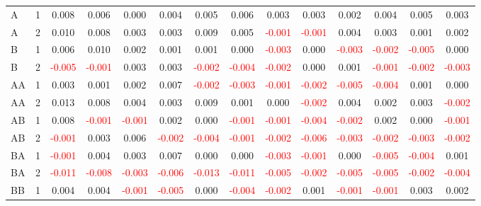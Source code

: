 \begin{table}[H]
{\begin{tabular}{llcccccccccccc}
A & 1 & 0.008 & 0.006 & 0.000 & 0.004 & 0.005 & 0.006 & 0.003 & 0.003 & 0.002 & 0.004 & 0.005 & 0.003\\
A & 2 & 0.010 & 0.008 & 0.003 & 0.003 & 0.009 & 0.005 & \textcolor{red}{-0.001} & \textcolor{red}{-0.001} & 0.004 & 0.003 & 0.001 & 0.002\\
B & 1 & 0.006 & 0.010 & 0.002 & 0.001 & 0.001 & 0.000 & \textcolor{red}{-0.003} & 0.000 & \textcolor{red}{-0.003} & \textcolor{red}{-0.002} & \textcolor{red}{-0.005} & 0.000\\
B & 2 & \textcolor{red}{-0.005} & \textcolor{red}{-0.001} & 0.003 & 0.003 & \textcolor{red}{-0.002} & \textcolor{red}{-0.004} & \textcolor{red}{-0.002} & 0.000 & 0.001 & \textcolor{red}{-0.001} & \textcolor{red}{-0.002} & \textcolor{red}{-0.003}\\
AA & 1 & 0.003 & 0.001 & 0.002 & 0.007 & \textcolor{red}{-0.002} & \textcolor{red}{-0.003} & \textcolor{red}{-0.001} & \textcolor{red}{-0.002} & \textcolor{red}{-0.005} & \textcolor{red}{-0.004} & 0.001 & 0.000\\
AA & 2 & 0.013 & 0.008 & 0.004 & 0.003 & 0.009 & 0.001 & 0.000 & \textcolor{red}{-0.002} & 0.004 & 0.002 & 0.003 & \textcolor{red}{-0.002}\\
AB & 1 & 0.008 & \textcolor{red}{-0.001} & \textcolor{red}{-0.001} & 0.002 & 0.000 & \textcolor{red}{-0.001} & \textcolor{red}{-0.001} & \textcolor{red}{-0.004} & \textcolor{red}{-0.002} & 0.002 & 0.000 & \textcolor{red}{-0.001}\\
AB & 2 & \textcolor{red}{-0.001} & 0.003 & 0.006 & \textcolor{red}{-0.002} & \textcolor{red}{-0.004} & \textcolor{red}{-0.001} & \textcolor{red}{-0.002} & \textcolor{red}{-0.006} & \textcolor{red}{-0.003} & \textcolor{red}{-0.002} & \textcolor{red}{-0.003} & \textcolor{red}{-0.002}\\
BA & 1 & \textcolor{red}{-0.001} & 0.004 & 0.003 & 0.007 & 0.000 & 0.000 & \textcolor{red}{-0.003} & \textcolor{red}{-0.001} & 0.000 & \textcolor{red}{-0.005} & \textcolor{red}{-0.004} & 0.001\\
BA & 2 & \textcolor{red}{-0.011} & \textcolor{red}{-0.008} & \textcolor{red}{-0.003} & \textcolor{red}{-0.006} & \textcolor{red}{-0.013} & \textcolor{red}{-0.011} & \textcolor{red}{-0.005} & \textcolor{red}{-0.002} & \textcolor{red}{-0.005} & \textcolor{red}{-0.005} & \textcolor{red}{-0.002} & \textcolor{red}{-0.004}\\
BB & 1 & 0.004 & 0.004 & \textcolor{red}{-0.001} & \textcolor{red}{-0.005} & 0.000 & \textcolor{red}{-0.004} & \textcolor{red}{-0.002} & 0.001 & \textcolor{red}{-0.001} & \textcolor{red}{-0.001} & 0.003 & 0.002\\

\end{tabular}}
\end{table}
